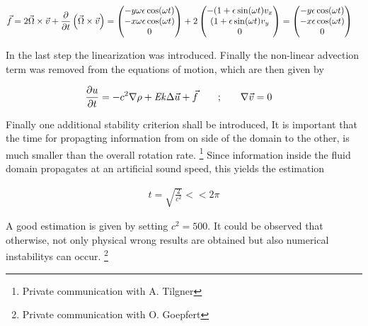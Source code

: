 \begin{align}
    \vec{f} &= 2 \vec{\Omega} \times \vec{v} + \pdn[]{t}\left(\vec{\Omega} \times \vec{v} \right)
            = \begin{pmatrix}
           -y \omega \epsilon \cos(\omega t) \\
           -x \omega \epsilon \cos(\omega t) \\
           0\\
         \end{pmatrix}
            + 2\begin{pmatrix}
           - ( 1 + \epsilon \sin(\omega t)v_x \\
             ( 1 + \epsilon \sin(\omega t)v_y \\
           0\\
         \end{pmatrix}
            = \begin{pmatrix}
           -y \epsilon \cos(\omega t) \\
           -x \epsilon \cos(\omega t) \\
           0\\
         \end{pmatrix}
\end{align}

In the last step the linearization was introduced.
Finally the non-linear advection term was removed from the equations of motion, which
are then given by

\begin{align}
    \label{theorie:rotns}
    \pdn[u]{t} = -c^2\nabla \rho + \Ekman \Delta \vec{u} + \vec{f} \qquad;& \qquad  \nabla \vec{v} = 0
\end{align}

Finally one additional stability criterion shall be introduced,
It is important that the time for propagting information from on side of the domain
to the other, is much smaller than the overall rotation rate.
\footnote{Private communication with A. Tilgner}
Since information inside the fluid domain propagates at an artificial sound speed,
this yields the estimation

\begin{align}
    t = \sqrt{\frac{2}{c^2}} << 2\pi
\end{align}

A good estimation is given by setting $c^2 = 500$.
It could be observed that otherwise, not only physical wrong results are obtained but also
numerical instabilitys can occur.
\footnote{Private communication with O. Goepfert}
\newpage

